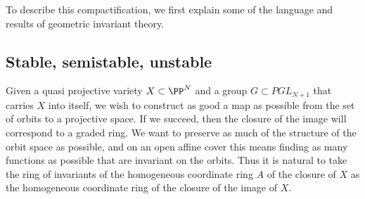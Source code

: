 To describe this compactification, we first explain some of the language and results of geometric
invariant theory.






\subsection{Stable, semistable, unstable}

Given a quasi projective variety $X \subset \PP^N$ and a group $G \subset PGL_{N+1}$ that carries $X$ into itself, we wish to construct as good a map as possible from the set of orbits
to a projective space. If we succeed, then the closure of the
image will correspond to a graded ring. We want to preserve as much of the structure of the orbit space as possible, and on an open affine cover
this means finding as many functions as possible that are invariant on the orbits. Thus it is natural to take the ring of invariants
of the homogeneous coordinate ring $A$ of the closure of $X$ as the homogeneous coordinate ring of the closure
of the image of $X$. 

